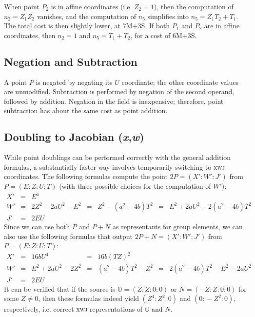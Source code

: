 \documentclass{llncs}
\newcommand{\neutral}{\mathbb{O}}
\newcommand{\xwj}{\textsc{xwj}\xspace}
\begin{document}
When point $P_2$ is in affine coordinates (i.e. $Z_2 = 1$), then the
computation of $n_2 = Z_1 Z_2$ vanishes, and the computation of $n_5$
simplifies into $n_5 = Z_1 T_2 + T_1$. The total cost is then slightly
lower, at 7M+3S. If both $P_1$ and $P_2$ are in affine coordinates,
then $n_2 = 1$ and $n_5 = T_1 + T_2$, for a cost of 6M+3S.

\subsection{Negation and Subtraction}

A point $P$ is negated by negating its $U$ coordinate; the other
coordinate values are unmodified. Subtraction is performed by negation
of the second operand, followed by addition. Negation in the field is
inexpensive; therefore, point subtraction has about the same cost as
point addition.

\subsection{Doubling to Jacobian (\emph{x},\emph{w})}

While point doublings can be performed correctly with the general
addition formulas, a substantially faster way involves temporarily
switching to \xwj coordinates. The following formulas compute the
point $2P = (X'{:}W'{:}J')$ from $P = (E{:}Z{:}U{:}T)$ (with three
possible choices for the computation of $W'$):
\begin{equation*}
    \begin{array}{rclclcl}
        X' &=& E^4 & & & & \\
        W' &=& 2Z^2 - 2aU^2 - E^2
           &=& Z^2 - (a^2-4b) T^2
           &=& E^2 + 2aU^2 - 2(a^2-4b) T^2 \\
        J' &=& 2EU
    \end{array}
\end{equation*}
Since we can use both $P$ and $P+N$ as representants for group elements,
we can also use the following formulas that output $2P+N = (X'{:}W'{:}J')$
from $P = (E{:}Z{:}U{:}T)$:
\begin{equation*}
    \begin{array}{rclclcl}
        X' &=& 16b U^4
           &=& 16b (TZ)^2 & & \\
        W' &=& E^2 + 2aU^2 - 2Z^2
           &=& (a^2-4b) T^2 - Z^2
           &=& 2(a^2-4b) T^2 - E^2 - 2aU^2 \\
        J' &=& 2EU
    \end{array}
\end{equation*}
It can be verified that if the source is $\neutral = (Z{:}Z{:}0{:}0)$
or $N = (-Z{:}Z{:}0{:}0)$ for some $Z \neq 0$, then these formulas
indeed yield $(Z^4{:}Z^2{:}0)$ and $(0{:}\!-\!\!Z^2{:}0)$, respectively,
i.e. correct \xwj representations of $\neutral$ and $N$.
\end{document}
